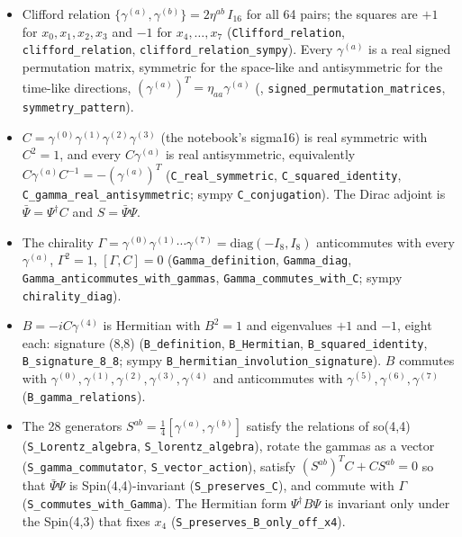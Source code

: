 \documentclass[11pt]{article}
\begin{document}
\begin{itemize}
\item Clifford relation $\{\gamma^{(a)}, \gamma^{(b)}\} = 2\eta^{ab}\,I_{16}$ for all 64 pairs; the squares are $+1$ for $x_0, x_1, x_2, x_3$ and $-1$ for $x_4, \dots, x_7$ (\texttt{Clifford\allowbreak{}\_relatio\allowbreak{}n}, \texttt{clifford\allowbreak{}\_relatio\allowbreak{}n}, \texttt{clifford\allowbreak{}\_relatio\allowbreak{}n\_sympy}). Every $\gamma^{(a)}$ is a real signed permutation matrix, symmetric for the space-like and antisymmetric for the time-like directions, $(\gamma^{(a)})^T = \eta_{aa}\gamma^{(a)}$ (\texttt{}, \texttt{signed\_p\allowbreak{}ermutati\allowbreak{}on\_matri\allowbreak{}ces}, \texttt{symmetry\allowbreak{}\_pattern}).
\item $C = \gamma^{(0)}\gamma^{(1)}\gamma^{(2)}\gamma^{(3)}$ (the notebook's sigma16) is real symmetric with $C^2 = 1$, and every $C\gamma^{(a)}$ is real antisymmetric, equivalently $C\gamma^{(a)}C^{-1} = -(\gamma^{(a)})^T$ (\texttt{C\_real\_s\allowbreak{}ymmetric}, \texttt{C\_square\allowbreak{}d\_identi\allowbreak{}ty}, \texttt{C\_gamma\_\allowbreak{}real\_ant\allowbreak{}isymmetr\allowbreak{}ic}; sympy \texttt{C\_conjug\allowbreak{}ation}). The Dirac adjoint is $\bar\Psi = \Psi^\dagger C$ and $S = \bar\Psi\Psi$.
\item The chirality $\Gamma = \gamma^{(0)}\gamma^{(1)}\cdots\gamma^{(7)} = \mathrm{diag}(-I_8, I_8)$ anticommutes with every $\gamma^{(a)}$, $\Gamma^2 = 1$, $[\Gamma, C] = 0$ (\texttt{Gamma\_de\allowbreak{}finition}, \texttt{Gamma\_di\allowbreak{}ag}, \texttt{Gamma\_an\allowbreak{}ticommut\allowbreak{}es\_with\_\allowbreak{}gammas}, \texttt{Gamma\_co\allowbreak{}mmutes\_w\allowbreak{}ith\_C}; sympy \texttt{chiralit\allowbreak{}y\_diag}).
\item $B = -iC\gamma^{(4)}$ is Hermitian with $B^2 = 1$ and eigenvalues $+1$ and $-1$, eight each: signature (8,8) (\texttt{B\_defini\allowbreak{}tion}, \texttt{B\_Hermit\allowbreak{}ian}, \texttt{B\_square\allowbreak{}d\_identi\allowbreak{}ty}, \texttt{B\_signat\allowbreak{}ure\_8\_8}; sympy \texttt{B\_hermit\allowbreak{}ian\_invo\allowbreak{}lution\_s\allowbreak{}ignature}). $B$ commutes with $\gamma^{(0)}, \gamma^{(1)}, \gamma^{(2)}, \gamma^{(3)}, \gamma^{(4)}$ and anticommutes with $\gamma^{(5)}, \gamma^{(6)}, \gamma^{(7)}$ (\texttt{B\_gamma\_\allowbreak{}relation\allowbreak{}s}).
\item The 28 generators $S^{ab} = \frac14[\gamma^{(a)}, \gamma^{(b)}]$ satisfy the relations of so(4,4) (\texttt{S\_Lorent\allowbreak{}z\_algebr\allowbreak{}a}, \texttt{S\_lorent\allowbreak{}z\_algebr\allowbreak{}a}), rotate the gammas as a vector (\texttt{S\_gamma\_\allowbreak{}commutat\allowbreak{}or}, \texttt{S\_vector\allowbreak{}\_action}), satisfy $(S^{ab})^T C + CS^{ab} = 0$ so that $\bar\Psi\Psi$ is Spin(4,4)-invariant (\texttt{S\_preser\allowbreak{}ves\_C}), and commute with $\Gamma$ (\texttt{S\_commut\allowbreak{}es\_with\_\allowbreak{}Gamma}). The Hermitian form $\Psi^\dagger B\Psi$ is invariant only under the Spin(4,3) that fixes $x_4$ (\texttt{S\_preser\allowbreak{}ves\_B\_on\allowbreak{}ly\_off\_x\allowbreak{}4}).
\end{itemize}
\end{document}
